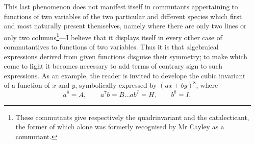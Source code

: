 \documentclass[11pt]{article}
\begin{document}
This last phenomenon does not manifest itself in commutants appertaining to functions of two variables of the two particular and different species which first and most naturally present themselves, namely where there are only two lines or only two columns\footnote{These commutants give respectively the quadrinvariant and the catalecticant, the former of which alone was formerly recognised by Mr Cayley as a commutant.}---I believe that it displays itself in every other case of commutantives to functions of two variables. Thus it is that algebraical expressions derived from given functions disguise their symmetry; to make which come to light it becomes necessary to add terms of contrary sign to such expressions. As an example, the reader is invited to develope the cubic invariant of a function of $x$ and $y$, symbolically expressed by $(ax+by)^8$, where
\[
a^8=A,\qquad a^7b=B\ldots ab^7=H,\qquad b^8=I,
\]
\end{document}
